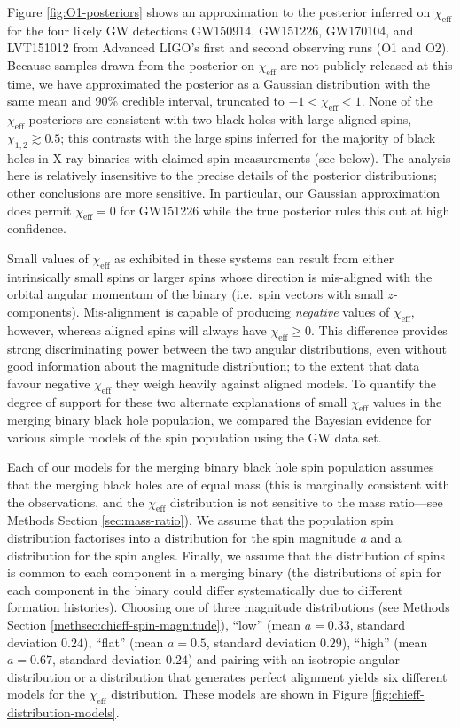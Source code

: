 \documentclass{nature-arxiv}
\newcommand{\chieff}{\chi_\mathrm{eff}}
\begin{document}
Figure \ref{fig:O1-posteriors} shows an approximation to the posterior
inferred on $\chieff$ for the four likely \ac{GW} detections GW150914,
GW151226, GW170104, and LVT151012 from Advanced LIGO's first and
second observing runs (O1 and O2)\cite{O1-BBH,PhysRevLett.118.221101}.
Because samples drawn from the posterior on $\chieff$ are not publicly
released at this time, we have approximated the posterior as a
Gaussian distribution with the same mean and 90\% credible interval,
truncated to $-1 < \chieff < 1$.  None of the $\chieff$ posteriors are
consistent with two black holes with large aligned spins,
$\chi_{1,2} \gtrsim 0.5$; this contrasts with the large spins inferred
for the majority of black holes in X-ray binaries with claimed spin
measurements\cite{2015PhR...548....1M} (see below).  The analysis here
is relatively insensitive to the precise details of the posterior
distributions; other conclusions are more sensitive.  In particular,
our Gaussian approximation does permit $\chieff = 0$ for GW151226
while the true posterior rules this out at high
confidence\cite{2016PhRvL.116x1103A,O1-BBH}.

Small values of $\chieff$ as exhibited in these systems can result
from either intrinsically small spins or larger spins whose direction
is mis-aligned with the orbital angular momentum of the binary (i.e.\
spin vectors with small $z$-components).  Mis-alignment is capable of
producing \emph{negative} values of $\chieff$, however, whereas
aligned spins will always have $\chieff \geq 0$.  This difference
provides strong discriminating power between the two angular
distributions, even without good information about the magnitude
distribution; to the extent that data favour negative $\chieff$ they
weigh heavily against aligned models.  To quantify the degree of
support for these two alternate explanations of small $\chieff$ values
in the merging binary black hole population, we compared the Bayesian
evidence for various simple models of the spin population using the
\ac{GW} data set.

Each of our models for the merging binary black hole spin population
assumes that the merging black holes are of equal mass (this is
marginally consistent with the
observations\cite{O1-BBH,PhysRevLett.118.221101}, and the $\chieff$
distribution is not sensitive to the mass ratio---see Methods Section
\ref{sec:mass-ratio}).  We assume that the population spin
distribution factorises into a distribution for the spin magnitude $a$
and a distribution for the spin angles.  Finally, we assume that the
distribution of spins is common to each component in a merging binary
(the distributions of spin for each component in the binary could
differ systematically due to different formation histories).  Choosing
one of three magnitude distributions (see Methods Section
\ref{methsec:chieff-spin-magnitude}), ``low'' (mean $a = 0.33$,
standard deviation $0.24$), ``flat'' (mean $a = 0.5$, standard
deviation $0.29$), ``high'' (mean $a = 0.67$, standard deviation
$0.24$) and pairing with an isotropic angular distribution or a
distribution that generates perfect alignment yields six different
models for the $\chieff$ distribution.  These models are shown in
Figure \ref{fig:chieff-distribution-models}.
\end{document}
